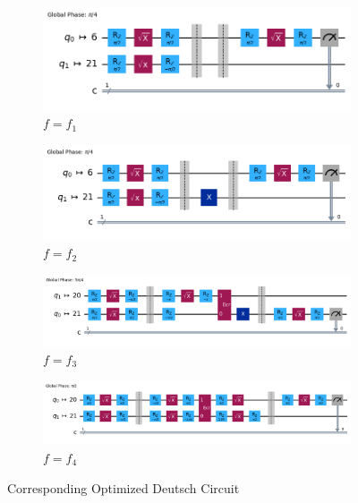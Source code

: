 \documentclass[12pt, oneside]{book}
\theoremstyle{definition}
\theoremstyle{definition}
\theoremstyle{remark}
\begin{document}
\begin{enumerate}
    \begin{figure}[H]
        \centering
        \begin{subfigure}[b]{0.6\linewidth}
        \centering
        \includegraphics[width=1\linewidth]{../images/opt_deutsch_f1.png}
        \caption{$f=f_1$}
        \label{fig:opt_deutsch_f1}
        \end{subfigure}
        \hfill
        \centering
        \begin{subfigure}[b]{0.6\linewidth}
        \centering
        \includegraphics[width=1\linewidth]{../images/opt_deutsch_f2.png}
        \caption{$f=f_2$}
        \label{fig:opt_deutsch_f2}
        \end{subfigure}
        \vspace{0.5 cm}
        \begin{subfigure}[b]{0.6\linewidth}
        \centering
        \includegraphics[width=1\linewidth]{../images/opt_deutsch_f3.png}
        \caption{$f=f_3$}
        \label{fig:opt_deutsch_f3}
        \end{subfigure}
        \hfill
        \begin{subfigure}[b]{0.6\textwidth}
        \centering
        \includegraphics[width=1\linewidth]{../images/opt_deutsch_f4.png}
        \caption{$f=f_4$}
        \label{fig:opt_deutsch_f4}
        \end{subfigure}    
        \caption{Corresponding Optimized Deutsch Circuit}
        \label{fig:opt_deutsch_circuit}
    \end{figure}


\end{enumerate}
\end{document}
